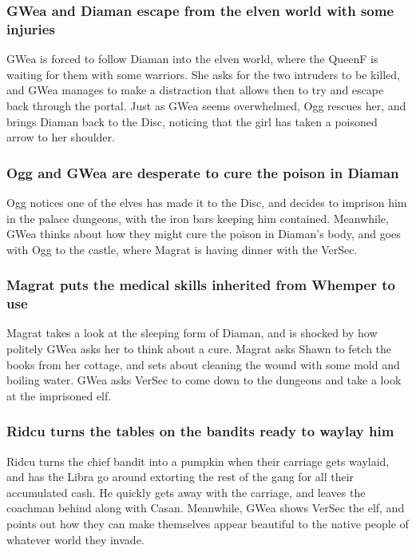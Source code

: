 \subsubsection{\Gls{GWea} and \Gls{Diaman} escape from the elven world with some injuries}
\Gls{GWea} is forced to follow \Gls{Diaman} into the elven world, where the \Gls{QueenF} is waiting
for them with some warriors. She asks for the two intruders to be killed, and \Gls{GWea} manages
to make a distraction that allows then to try and escape back through the portal. Just as \Gls{GWea}
seems overwhelmed, \Gls{Ogg} rescues her, and brings \Gls{Diaman} back to the Disc, noticing that
the girl has taken a poisoned arrow to her shoulder.

\subsubsection{\Gls{Ogg} and \Gls{GWea} are desperate to cure the poison in \Gls{Diaman}}
\Gls{Ogg} notices one of the elves has made it to the Disc, and decides to imprison him in the
palace dungeons, with the iron bars keeping him contained. Meanwhile, \Gls{GWea} thinks about how
they might cure the poison in \Gls{Diaman}'s body, and goes with \Gls{Ogg} to the castle, where
\Gls{Magrat} is having dinner with the \Gls{VerSec}.

\subsubsection{\Gls{Magrat} puts the medical skills inherited from \Gls{Whemper} to use}
\Gls{Magrat} takes a look at the sleeping form of \Gls{Diaman}, and is shocked by how politely
\Gls{GWea} asks her to think about a cure. \Gls{Magrat} asks \Gls{Shawn} to fetch the books from her
cottage, and sets about cleaning the wound with some mold and boiling water. \Gls{GWea} asks
\Gls{VerSec} to come down to the dungeons and take a look at the imprisoned elf.

\subsubsection{\Gls{Ridcu} turns the tables on the bandits ready to waylay him}
\Gls{Ridcu} turns the chief bandit into a pumpkin when their carriage gets waylaid, and has the
\Gls{Libra} go around extorting the rest of the gang for all their accumulated cash. He quickly
gets away with the carriage, and leaves the coachman behind along with \Gls{Casan}. Meanwhile,
\Gls{GWea} shows \Gls{VerSec} the elf, and points out how they can make themselves appear beautiful
to the native people of whatever world they invade.

